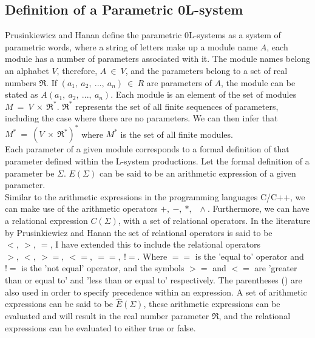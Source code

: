 \subsection{Definition of a Parametric 0L-system} \label{definition of a parametric 0L-system section}

\begin{flushleft}

Prusinkiewicz and Hanan define the parametric 0L-systems as a system of parametric words, where a string of letters make up a module name $A$, each module has a number of parameters associated with it. The module names belong an alphabet $V$, therefore, $A~ \in~ V$, and the parameters belong to a set of real numbers $\Re$. If $(a_1,~ a_2,~ ...,~ a_n)~ \in~ R$ are parameters of $A$, the module can be stated as $A(a_1,~ a_2,~ ...,~ a_n)$. Each module is an element of the set of modules $M~ =~ V~ \times~ \Re^*$. $\Re^*$ represents the set of all finite sequences of parameters, including the case where there are no parameters. We can then infer that $M^*~ =~ (V~ \times~ \Re^*)^*$ where $M^*$ is the set of all finite modules. \\
Each parameter of a given module corresponds to a formal definition of that parameter defined within the L-system productions. Let the formal definition of a parameter be $\Sigma$. $ E(\Sigma) $ can be said to be an arithmetic expression of a given parameter.\\ Similar to the arithmetic expressions in the programming languages C/C++, we can make use of the arithmetic operators $ +,~ -,~ *,~ \,~ \wedge{}$. Furthermore, we can have a relational expression $C(\Sigma)$, with a set of relational operators. In the literature by Prusinkiewicz and Hanan the set of relational operators is said to be $<,~ >,~ =$, I have extended this to include the relational operators $>,~ <,~ >=,~ <=,~ ==,~ !=$. Where $==$ is the 'equal to' operator and $!=$ is the 'not equal' operator, and the symbols $>=$ and $<=$ are 'greater than or equal to' and 'less than or equal to' respectively. The parentheses () are also used in order to specify precedence within an expression. A set of arithmetic expressions can be said to be $\hat{E} (\Sigma)$,  these arithmetic expressions can be evaluated and will result in the real number parameter $\Re $, and the relational expressions can be evaluated to either true or false. \\

\vspace{5mm}


\end{flushleft}
